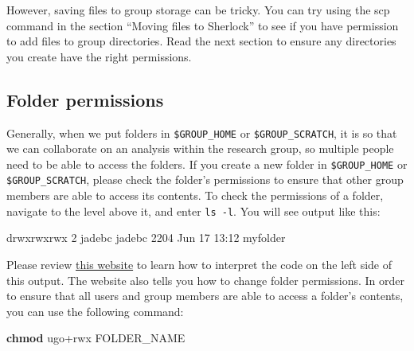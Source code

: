 \documentclass[
]{book}
\newenvironment{Shaded}{\begin{snugshade}}{\end{snugshade}}
\newcommand{\BuiltInTok}[1]{#1}
\newcommand{\ExtensionTok}[1]{#1}
\newcommand{\FunctionTok}[1]{\textcolor[rgb]{0.13,0.29,0.53}{\textbf{#1}}}
\newcommand{\NormalTok}[1]{#1}
\newcommand{\VariableTok}[1]{\textcolor[rgb]{0.00,0.00,0.00}{#1}}
\begin{document}
\begin{Shaded}
\end{Shaded}

However, saving files to group storage can be tricky. You can try using the scp command in the section ``Moving files to Sherlock'' to see if you have permission to add files to group directories. Read the next section to ensure any directories you create have the right permissions.

\subsection{Folder permissions}\label{folder-permissions}

Generally, when we put folders in \texttt{\$GROUP\_HOME} or \texttt{\$GROUP\_SCRATCH}, it is so that we can collaborate on an analysis within the research group, so multiple people need to be able to access the folders. If you create a new folder in \texttt{\$GROUP\_HOME} or \texttt{\$GROUP\_SCRATCH}, please check the folder's permissions to ensure that other group members are able to access its contents. To check the permissions of a folder, navigate to the level above it, and enter \texttt{ls\ -l}. You will see output like this:

\begin{Shaded}
\begin{Highlighting}[]
\ExtensionTok{drwxrwxrwx}\NormalTok{ 2 jadebc jadebc  2204 Jun 17 13:12 myfolder}
\end{Highlighting}
\end{Shaded}

Please review \href{https://www.chriswrites.com/how-to-change-file-permissions-using-the-terminal/}{this website} to learn how to interpret the code on the left side of this output. The website also tells you how to change folder permissions. In order to ensure that all users and group members are able to access a folder's contents, you can use the following command:

\begin{Shaded}
\begin{Highlighting}[]
\FunctionTok{chmod}\NormalTok{ ugo+rwx FOLDER\_NAME}
\end{Highlighting}
\end{Shaded}
\end{document}
